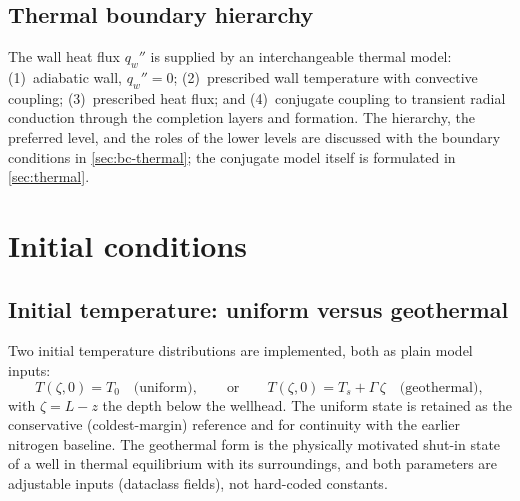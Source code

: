 \documentclass[11pt]{article}
\begin{document}
\subsection{Thermal boundary hierarchy}

The wall heat flux $q_w''$ is supplied by an interchangeable thermal
model: (1)~adiabatic wall, $q_w''=0$; (2)~prescribed wall temperature
with convective coupling; (3)~prescribed heat flux; and (4)~conjugate
coupling to transient radial conduction through the completion layers
and formation. The hierarchy, the preferred level, and the roles of the
lower levels are discussed with the boundary conditions in
\cref{sec:bc-thermal}; the conjugate model itself is formulated in
\cref{sec:thermal}.

\section{Initial conditions}
\label{sec:ic}

\subsection{Initial temperature: uniform versus geothermal}
\label{sec:ic-temperature}

Two initial temperature distributions are implemented, both as plain
model inputs:
\begin{equation}
T(\zeta, 0) = T_0 \quad\text{(uniform)}, \qquad\text{or}\qquad
T(\zeta, 0) = T_s + \Gamma\,\zeta \quad\text{(geothermal)},
\label{eq:geo-ic}
\end{equation}
with $\zeta = L - z$ the depth below the wellhead. The uniform state is
retained as the conservative (coldest-margin) reference and for
continuity with the earlier nitrogen baseline. The geothermal form is
the physically motivated shut-in state of a well in thermal equilibrium
with its surroundings, and both parameters are adjustable inputs
(dataclass fields), not hard-coded constants.
\end{document}
